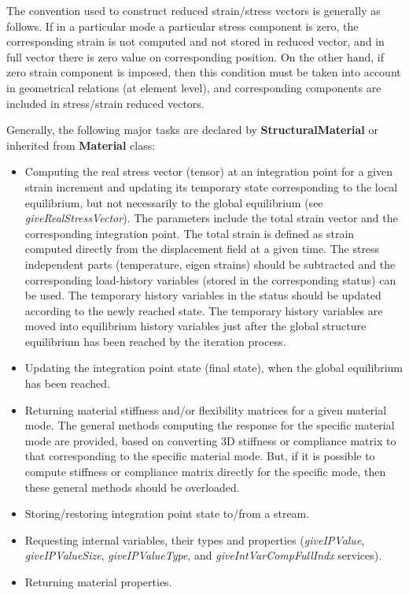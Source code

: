 \documentclass[12pt,draft]{article}
\newcommand{\class}[1]{{\bf #1}}
\newcommand{\service}[1]{{\em #1}}
\begin{document}
 The convention used to construct reduced strain/stress vectors is
 generally as follows.
 If in a particular mode a particular stress component is zero, the corresponding strain is not computed
 and not stored in reduced vector, and in full vector there is zero value on corresponding position.
 On the other hand, if zero strain component is imposed, then this condition must be taken into account in geometrical
 relations (at element level), and corresponding components are included
 in stress/strain reduced vectors.

 Generally, the following major tasks are declared by
 \class{StructuralMaterial} or inherited from \class{Material} class:
 \begin{itemize}
 \item
 Computing the real stress vector (tensor) at an integration point for
 a given strain increment and updating its temporary state corresponding to
 the local equilibrium, but not necessarily to the global equilibrium (see
 \service{giveRealStressVector}). The parameters include the total strain
 vector and the corresponding integration point. 
 The total strain is defined as strain computed directly from the
 displacement field at a given time.
 The stress independent parts (temperature, eigen strains) should be
 subtracted and  the corresponding load-history variables
 (stored in the corresponding status) can be used. The temporary
 history variables in the status should be updated according to the newly reached state.
 The temporary history variables are moved into equilibrium history
 variables just after the global structure
 equilibrium has been reached by the iteration process.
 \item
 Updating the integration point state (final state), when the global equilibrium
 has been reached. 
 \item
 Returning material stiffness and/or flexibility matrices for
 a given material mode. The general methods computing the response for
 the specific material mode are provided, based on converting 3D stiffness
 or compliance matrix to that corresponding to the specific material mode.
 But, if it is possible to compute stiffness or
 compliance matrix directly for the specific mode, then these general methods should be
 overloaded.
 \item
 Storing/restoring integration point state to/from a stream.
 \item
 Requesting internal variables, their types and properties
 (\service{giveIPValue}, \service{giveIPValueSize},
 \service{giveIPValueType}, and \service{giveIntVarCompFullIndx} services).
 \item
 Returning material properties.
 \end{itemize}
\end{document}

